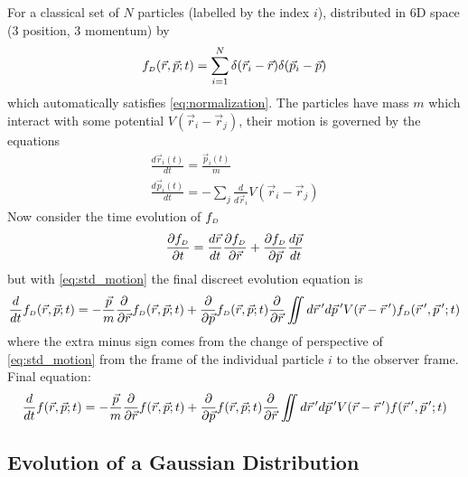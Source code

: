 For a classical set of $N$ particles (labelled by the index $i$), distributed in 6D space (3 position, 3 momentum) by 
\begin{equation}
  f_{{\scriptscriptstyle D}}(\vec{r}, \vec{p}; t) = 
  \sum\limits^{N}_{i=1} \delta(\vec{r}_{i} - \vec{r}) \delta(\vec{p}_{i} - \vec{p})
\end{equation}
which automatically satisfies \ref{eq:normalization}.
The particles have mass $m$ which interact with some potential $V(\vec{r}_{i} - \vec{r}_{j})$, their motion is governed by the equations
\begin{subequations}\label{eq:std_motion}
\begin{gather}
  \frac{d\vec{r}_{i}(t)}{dt} = \frac{\vec{p}_{i}(t)}{m}\\
  \frac{d\vec{p}_{i}(t)}{dt} = -\sum\limits_{j} \frac{d}{d\vec{r}_{i}} V(\vec{r}_{i} - \vec{r}_{j})
\end{gather}
\end{subequations}
Now consider the time evolution of $f_{{\scriptscriptstyle D}}$
\begin{equation}
  \frac{\partial f_{{\scriptscriptstyle D}}}{\partial t} = 
  \frac{d\vec{r}}{dt} \frac{\partial f_{{\scriptscriptstyle D}}}{\partial \vec{r}} 
  + \frac{\partial f_{{\scriptscriptstyle D}}}{\partial \vec{p}} \frac{d\vec{p}}{dt}
\end{equation}
but with \ref{eq:std_motion} the final discreet evolution equation is
\begin{equation}
  \frac{d}{dt} f_{{\scriptscriptstyle D}}(\vec{r}, \vec{p}; t) =
  -\frac{\vec{p}}{m} \frac{\partial}{\partial \vec{r}} f_{{\scriptscriptstyle D}}(\vec{r}, \vec{p}; t)
  + \frac{\partial}{\partial \vec{p}} f_{{\scriptscriptstyle D}} (\vec{r}, \vec{p}; t)
  \frac{\partial}{\partial \vec{r}} \iint d\vec{r}\,^{\prime} d\vec{p}\,^{\prime} V(\vec{r} - \vec{r}\,^{\prime}) f_{{\scriptscriptstyle D}}(\vec{r}\,^{\prime},\vec{p}\,^{\prime};t)
\end{equation}
where the extra minus sign comes from the change of perspective of \ref{eq:std_motion} from the frame of the individual particle $i$ to the observer frame.
Final equation:
\begin{equation} \label{eq:formal_evolution}
  \frac{d}{dt} f(\vec{r}, \vec{p}; t) =
  -\frac{\vec{p}}{m} \frac{\partial}{\partial \vec{r}} f(\vec{r}, \vec{p}; t)
  + \frac{\partial}{\partial \vec{p}} f (\vec{r}, \vec{p}; t)
  \frac{\partial}{\partial \vec{r}} \iint d\vec{r}\,^{\prime} d\vec{p}\,^{\prime} V(\vec{r} - \vec{r}\,^{\prime}) f(\vec{r}\,^{\prime},\vec{p}\,^{\prime};t)
\end{equation}

\subsection{Evolution of a Gaussian Distribution}

